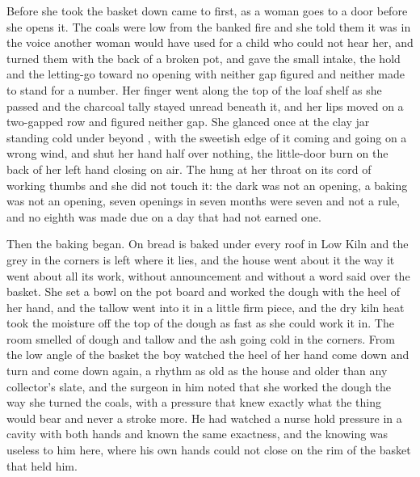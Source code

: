 Before she took the basket down  came to  first, as a woman goes to a door before she opens it. The coals were low from the banked fire and she told them it was  in the voice another woman would have used for a child who could not hear her, and turned them with the back of a broken pot, and gave the small intake, the hold and the letting-go toward no opening with neither gap figured and neither made to stand for a number. Her finger went along the top of the loaf shelf as she passed and the charcoal tally stayed unread beneath it, and her lips moved on a two-gapped row and figured neither gap. She glanced once at the clay jar standing cold under  beyond , with the sweetish edge of it coming and going on a wrong wind, and shut her hand half over nothing, the little-door burn on the back of her left hand closing on air. The  hung at her throat on its cord of working thumbs and she did not touch it: the dark was not an opening, a baking was not an opening, seven openings in seven months were seven and not a rule, and no eighth was made due on a day that had not earned one.

Then the baking began. On  bread is baked under every roof in Low Kiln and the grey in the corners is left where it lies, and the house went about it the way it went about all its work, without announcement and without a word said over the basket. She set a bowl on the pot board and worked the dough with the heel of her hand, and the tallow went into it in a little firm piece, and the dry kiln heat took the moisture off the top of the dough as fast as she could work it in. The room smelled of dough and tallow and the ash going cold in the corners. From the low angle of the basket the boy watched the heel of her hand come down and turn and come down again, a rhythm as old as the house and older than any collector's slate, and the surgeon in him noted that she worked the dough the way she turned the coals, with a pressure that knew exactly what the thing would bear and never a stroke more. He had watched a nurse hold pressure in a cavity with both hands and known the same exactness, and the knowing was useless to him here, where his own hands could not close on the rim of the basket that held him.

\scenebreak

